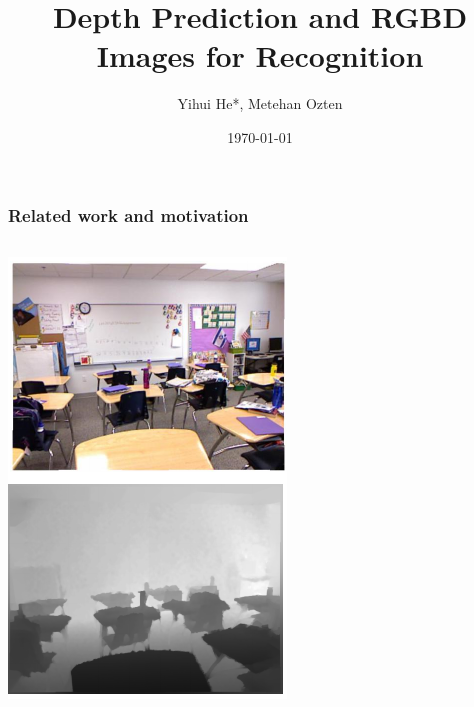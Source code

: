 \documentclass{beamer}
\title[Depth Prediction and RGBD Images for Recognition]{Depth Prediction and RGBD Images for Recognition} %
\author{Yihui He*, Metehan Ozten}
\institute[ ] %
{
\textit{yihuihe@foxmail.com, m\_ozten@umail.ucsb.edu}\\
\medskip
 *CS 2nd year exchange student\\ 
from Xi'an Jiaotong University, China\\%


}\date{\today}
\begin{document}
\begin{frame}
\titlepage
\end{frame}

\begin{frame}
\frametitle{Related work and motivation}
\begin{columns}
\begin{column}{.4\textwidth}
\includegraphics[width=\linewidth]{im2d.png}

\end{column}
\end{columns}
\end{frame}
\end{document}

